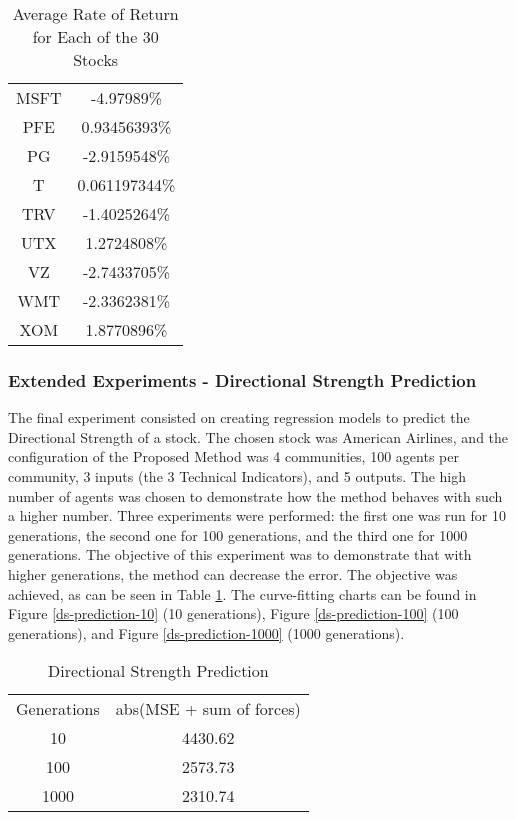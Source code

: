 \begin{table}
\begin{tabular}{ c c }
        MSFT & -4.97989\% \\ %
        PFE & 0.93456393\% \\ %
        PG & -2.9159548\% \\ %
        T & 0.061197344\% \\ %
        TRV & -1.4025264\% \\ %
        UTX & 1.2724808\% \\ %
        VZ & -2.7433705\% \\ %
        WMT & -2.3362381\% \\ %
        XOM & 1.8770896\% \\ %
    \end{tabular} 
    \caption{Average Rate of Return for Each of the 30 Stocks} 
\end{table}
  
\subsubsection{Extended Experiments - Directional Strength Prediction}
  
The final experiment consisted on creating regression models to predict the Directional Strength of a stock. The chosen stock was American Airlines, and the configuration of the Proposed Method was 4 communities, 100 agents per community, 3 inputs (the 3 Technical Indicators), and 5 outputs. The high number of agents was chosen to demonstrate how the method behaves with such a higher number. Three experiments were performed: the first one was run for 10 generations, the second one for 100 generations, and the third one for 1000 generations. The objective of this experiment was to demonstrate that with higher generations, the method can decrease the error. The objective was achieved, as can be seen in Table \ref{ds-mse-table}. The curve-fitting charts can be found in Figure \ref{ds-prediction-10} (10 generations), Figure \ref{ds-prediction-100} (100 generations), and Figure \ref{ds-prediction-1000} (1000 generations).

\begin{table}
    \caption{Directional Strength Prediction}
    \label{ds-mse-table}
    \begin{tabular}{ c c }
        Generations & abs(MSE + sum of forces) \\ 
        10 & 4430.62 \\ 
        100 & 2573.73 \\ 
        1000 & 2310.74 \\ 
    \end{tabular} 
\end{table}
  
